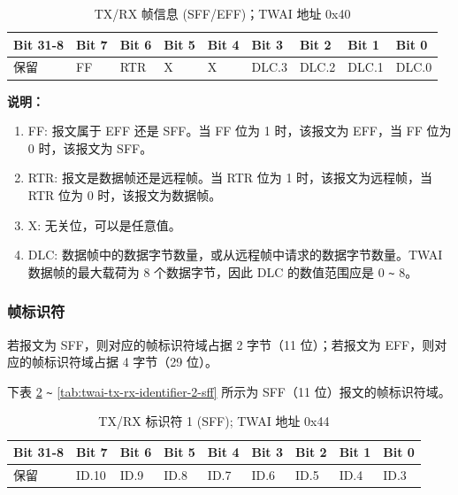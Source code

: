 \documentclass[main\_\_CN.tex]{subfiles}
\begin{document}
\begin{longtable}[c]{|p{1.4cm}|p{1.4cm}|p{1.4cm}|p{1.4cm}|p{1.4cm}|p{1.4cm}|p{1.4cm}|p{1.4cm}|p{1.4cm}|}
    \caption{TX/RX 帧信息 (SFF/EFF)；TWAI 地址 0x40}
    \label{tab:twai-tx-rx-frame-info-sff-eff}\\
    \hline
       \rowcolor{lightgray}
    \textbf{Bit 31-8} & \textbf{Bit 7} & \textbf{Bit 6} & \textbf{Bit 5} & \textbf{Bit 4} & \textbf{Bit 3} & \textbf{Bit 2} & \textbf{Bit 1} & \textbf{Bit 0}\\\hline
    保留 & FF & RTR  & X  & X  & DLC.3 & DLC.2 & DLC.1 & DLC.0\\
    \hline
\end{longtable}
\vspace{-1.5em}
{\bfseries 说明：}\\
\begin{enumerate}
    \item FF: 报文属于 EFF 还是 SFF。当 FF 位为 1 时，该报文为 EFF，当 FF 位为 0 时，该报文为 SFF。
    \item RTR: 报文是数据帧还是远程帧。当 RTR 位为 1 时，该报文为远程帧，当 RTR 位为 0 时，该报文为数据帧。
    \item X: 无关位，可以是任意值。
    \item DLC: 数据帧中的数据字节数量，或从远程帧中请求的数据字节数量。TWAI 数据帧的最大载荷为 8 个数据字节，因此 DLC 的数值范围应是 0 \verb+~+ 8。
\end{enumerate}

\subsubsection{帧标识符}
若报文为 SFF，则对应的帧标识符域占据 2 字节（11 位）；若报文为 EFF，则对应的帧标识符域占据 4 字节（29 位）。

下表 \ref{tab:twai-tx-rx-identifier-1-sff} \verb+~+ \ref{tab:twai-tx-rx-identifier-2-sff} 所示为 SFF（11 位）报文的帧标识符域。

\begin{longtable}[c]{|p{1.4cm}|p{1.4cm}|p{1.4cm}|p{1.4cm}|p{1.4cm}|p{1.4cm}|p{1.4cm}|p{1.4cm}|p{1.4cm}|}
    \caption{TX/RX 标识符 1 (SFF); TWAI 地址 0x44}
    \label{tab:twai-tx-rx-identifier-1-sff}\\
    \hline
       \rowcolor{lightgray}
    \textbf{Bit 31-8} & \textbf{Bit 7} & \textbf{Bit 6} & \textbf{Bit 5} & \textbf{Bit 4} & \textbf{Bit 3} & \textbf{Bit 2} & \textbf{Bit 1} & \textbf{Bit 0}\\\hline
    保留 & ID.10 & ID.9 & ID.8 & ID.7 & ID.6 & ID.5 & ID.4 & ID.3\\
    \hline
\end{longtable}
\end{document}
